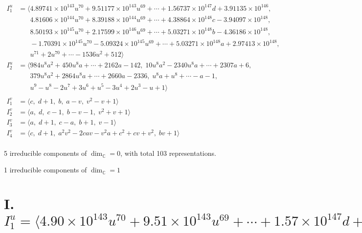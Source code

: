 \documentclass[1p]{elsarticle_modified}
\theoremstyle{definition}
\begin{document}
\begin{align*}
I^u_{1}&=\langle 
4.89741\times10^{143} u^{70}+9.51177\times10^{143} u^{69}+\cdots+1.56737\times10^{147} d+3.91135\times10^{146},\\
\phantom{I^u_{1}}&\phantom{= \langle  }4.81606\times10^{144} u^{70}+8.39188\times10^{144} u^{69}+\cdots+4.38864\times10^{148} c-3.94097\times10^{148},\\
\phantom{I^u_{1}}&\phantom{= \langle  }8.50193\times10^{145} u^{70}+2.17599\times10^{146} u^{69}+\cdots+5.03271\times10^{148} b-4.36186\times10^{148},\\
\phantom{I^u_{1}}&\phantom{= \langle  }-1.70391\times10^{145} u^{70}-5.09324\times10^{145} u^{69}+\cdots+5.03271\times10^{148} a+2.97413\times10^{148},\\
\phantom{I^u_{1}}&\phantom{= \langle  }u^{71}+2 u^{70}+\cdots-1536 u^2+512\rangle \\
I^u_{2}&=\langle 
984 u^8 a^2+450 u^8 a+\cdots+2162 a-142,\;10 u^8 a^2-2340 u^8 a+\cdots+2307 a+6,\\
\phantom{I^u_{2}}&\phantom{= \langle  }379 u^8 a^2+2864 u^8 a+\cdots+2660 a-2336,\;u^8 a+u^8+\cdots- a-1,\\
\phantom{I^u_{2}}&\phantom{= \langle  }u^9- u^8-2 u^7+3 u^6+u^5-3 u^4+2 u^3- u+1\rangle \\
\\
I^v_{1}&=\langle 
c,\;d+1,\;b,\;a- v,\;v^2- v+1\rangle \\
I^v_{2}&=\langle 
a,\;d,\;c-1,\;b- v-1,\;v^2+v+1\rangle \\
I^v_{3}&=\langle 
a,\;d+1,\;c- a,\;b+1,\;v-1\rangle \\
I^v_{4}&=\langle 
c,\;d+1,\;a^2 v^2-2 c a v- v^2 a+c^2+c v+v^2,\;b v+1\rangle \\
\end{align*}
\raggedright * 5 irreducible components of $\dim_{\mathbb{C}}=0$, with total 103 representations.\\
\raggedright * 1 irreducible components of $\dim_{\mathbb{C}}=1$ \\
\newpage
\renewcommand{\arraystretch}{1}
\centering \section*{I. $I^u_{1}= \langle 4.90\times10^{143} u^{70}+9.51\times10^{143} u^{69}+\cdots+1.57\times10^{147} d+3.91\times10^{146},\;4.82\times10^{144} u^{70}+8.39\times10^{144} u^{69}+\cdots+4.39\times10^{148} c-3.94\times10^{148},\;8.50\times10^{145} u^{70}+2.18\times10^{146} u^{69}+\cdots+5.03\times10^{148} b-4.36\times10^{148},\;-1.70\times10^{145} u^{70}-5.09\times10^{145} u^{69}+\cdots+5.03\times10^{148} a+2.97\times10^{148},\;u^{71}+2 u^{70}+\cdots-1536 u^2+512 \rangle$}
\end{document}
